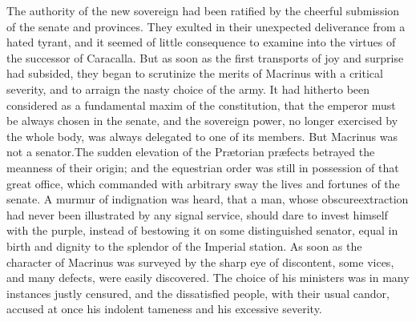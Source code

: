 
The authority of the new sovereign had been ratified by the
cheerful submission of the senate and provinces. They exulted in
their unexpected deliverance from a hated tyrant, and it seemed
of little consequence to examine into the virtues of the
successor of Caracalla. But as soon as the first transports of
joy and surprise had subsided, they began to scrutinize the
merits of Macrinus with a critical severity, and to arraign the
nasty choice of the army. It had hitherto been considered as a
fundamental maxim of the constitution, that the emperor must be
always chosen in the senate, and the sovereign power, no longer
exercised by the whole body, was always delegated to one of its
members. But Macrinus was not a senator.\footnotemark[42] The sudden elevation
of the Prætorian præfects betrayed the meanness of their origin;
and the equestrian order was still in possession of that great
office, which commanded with arbitrary sway the lives and
fortunes of the senate. A murmur of indignation was heard, that a
man, whose obscure\footnotemark[43] extraction had never been illustrated by
any signal service, should dare to invest himself with the
purple, instead of bestowing it on some distinguished senator,
equal in birth and dignity to the splendor of the Imperial
station. As soon as the character of Macrinus was surveyed by the
sharp eye of discontent, some vices, and many defects, were
easily discovered. The choice of his ministers was in many
instances justly censured, and the dissatisfied people, with
their usual candor, accused at once his indolent tameness and his
excessive severity.\footnotemark[44]



